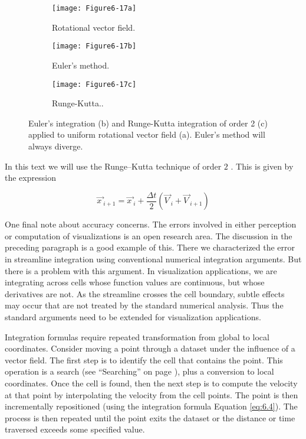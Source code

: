 \begin{figure}[htb]
	\begin{subfigure}[h]{0.32\linewidth}
		\texttt{[image: Figure6-17a]}
		\caption{Rotational vector field.}\label{fig:Figure6-17a}
	\end{subfigure}
	\hfill
	\begin{subfigure}[h]{0.32\linewidth}
	\texttt{[image: Figure6-17b]}
	\caption{Euler's method.}\label{fig:Figure6-17b}
	\end{subfigure}
	\hfill
	\begin{subfigure}[h]{0.32\linewidth}
	\texttt{[image: Figure6-17c]}
	\caption{Runge-Kutta..}\label{fig:Figure6-17c}
\end{subfigure}
	\caption{Euler's integration (b) and Runge-Kutta integration of order 2 (c) applied to uniform rotational vector field (a). Euler's method will always diverge.}\label{fig:Figure6-17}
\end{figure}

In this text we will use the Runge--Kutta technique of order $2$ \cite{Conte72}. This is given by the expression

\begin{equation}\label{eq:6.4}
\overrightarrow{x\ }_{i+1} = \overrightarrow{x\ }_i +\frac{\Delta t}{2}(\overrightarrow{V\ }_i + \overrightarrow{V\ }_{i+1})
\end{equation}

One final note about accuracy concerns. The errors involved in either perception or computation of visualizations is an open research area. The discussion in the preceding paragraph is a good example of this. There we characterized the error in streamline integration using conventional numerical integration arguments. But there is a problem with this argument. In visualization applications, we are integrating across cells whose function values are continuous, but whose derivatives are not. As the streamline crosses the cell boundary, subtle effects may occur that are not treated by the standard numerical analysis. Thus the standard arguments need to be extended for visualization applications.

Integration formulas require repeated transformation from global to local coordinates. Consider moving a point through a dataset under the influence of a vector field. The first step is to identify the cell that contains the point. This operation is a search (see ``Searching'' on page \pageref{sec:searching} ), plus a conversion to local coordinates. Once the cell is found, then the next step is to compute the velocity at that point by interpolating the velocity from the cell points. The point is then incrementally repositioned (using the integration formula Equation \ref{eq:6.4}).
The process is then repeated until the point exits the dataset or the distance or time traversed exceeds some specified value.


